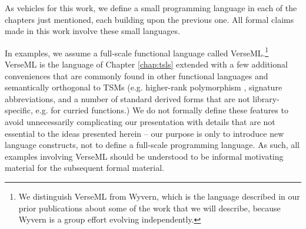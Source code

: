As vehicles for this work, we define a small programming language in each of the chapters just mentioned, each building upon the previous one. All formal claims made in this work involve these small languages.

In examples, we assume a full-scale functional language called VerseML.\footnote{We distinguish VerseML from Wyvern, which is the language described in our prior publications about some of the work that we will describe, because Wyvern is a group effort evolving independently.} VerseML is the language of Chapter \ref{chap:tsls}  extended with a few additional conveniences that are commonly found in other functional languages and semantically orthogonal to TSMs (e.g. higher-rank polymorphism \cite{conf/icfp/DunfieldK13}, signature abbreviations, and a number of standard derived forms that are not library-specific, e.g. for curried functions.) %
We do not formally define these features to avoid unnecessarily complicating our presentation with details that are not essential to the ideas presented herein -- our purpose is only to introduce new language constructs, not to define a full-scale programming language. As such, all examples involving VerseML should be understood to be informal motivating material for the subsequent formal material. %

